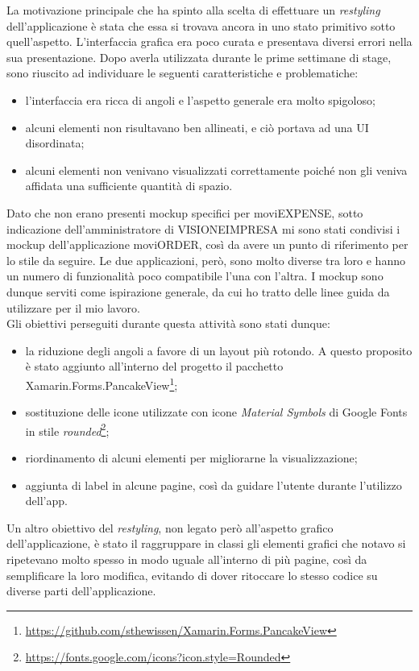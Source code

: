 La motivazione principale che ha spinto alla scelta di effettuare un \emph{restyling} dell'applicazione è stata che essa si trovava ancora in uno stato primitivo sotto quell'aspetto. L'interfaccia grafica era poco curata e presentava diversi errori nella sua presentazione. Dopo averla utilizzata durante le prime settimane di stage, sono riuscito ad individuare le seguenti caratteristiche e problematiche:
\begin{itemize}
    \item l'interfaccia era ricca di angoli e l'aspetto generale era molto spigoloso;
    \item alcuni elementi non risultavano ben allineati, e ciò portava ad una UI disordinata;
    \item alcuni elementi non venivano visualizzati correttamente poiché non gli veniva affidata una sufficiente quantità di spazio.
\end{itemize}

\noindent Dato che non erano presenti mockup specifici per moviEXPENSE, sotto indicazione dell'amministratore di VISIONEIMPRESA mi sono stati condivisi i mockup dell'applicazione moviORDER, così da avere un punto di riferimento per lo stile da seguire. Le due applicazioni, però, sono molto diverse tra loro e hanno un numero di funzionalità poco compatibile l'una con l'altra. I mockup sono dunque serviti come ispirazione generale, da cui ho tratto delle linee guida da utilizzare per il mio lavoro.\\
Gli obiettivi perseguiti durante questa attività sono stati dunque:
\begin{itemize}
    \item la riduzione degli angoli a favore di un layout più rotondo. A questo proposito è stato aggiunto all'interno del progetto il pacchetto Xamarin.Forms.PancakeView\footnote{\url{https://github.com/sthewissen/Xamarin.Forms.PancakeView}};
    \item sostituzione delle icone utilizzate con icone \textit{Material Symbols} di Google Fonts in stile \textit{rounded}\footnote{\url{https://fonts.google.com/icons?icon.style=Rounded}};
    \item riordinamento di alcuni elementi per migliorarne la visualizzazione;
    \item aggiunta di label in alcune pagine, così da guidare l'utente durante l'utilizzo dell'app.
\end{itemize}

\noindent Un altro obiettivo del \emph{restyling}, non legato però all'aspetto grafico dell'applicazione, è stato il raggruppare in classi gli elementi grafici che notavo si ripetevano molto spesso in modo uguale all'interno di più pagine, così da semplificare la loro modifica, evitando di dover ritoccare lo stesso codice su diverse parti dell'applicazione.

